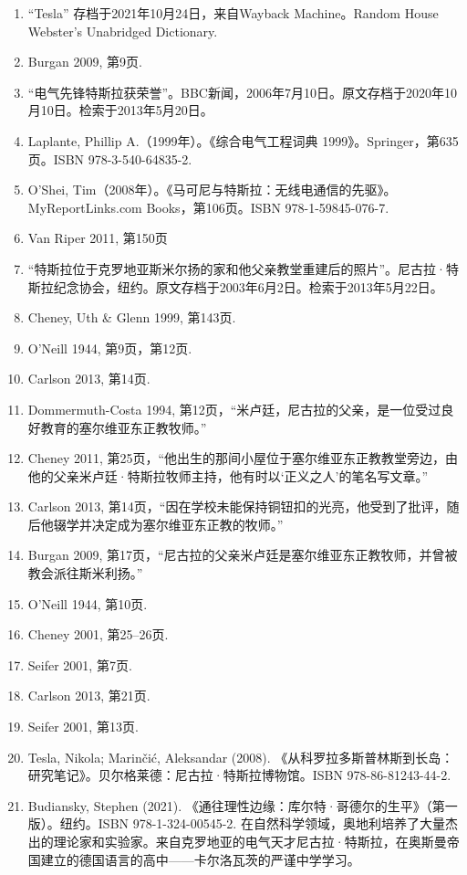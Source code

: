 \begin{enumerate}
\item “Tesla” 存档于2021年10月24日，来自Wayback Machine。Random House Webster's Unabridged Dictionary.  
\item Burgan 2009, 第9页.  
\item “电气先锋特斯拉获荣誉”。BBC新闻，2006年7月10日。原文存档于2020年10月10日。检索于2013年5月20日。  
\item Laplante, Phillip A.（1999年）。《综合电气工程词典 1999》。Springer，第635页。ISBN 978-3-540-64835-2.  
\item O'Shei, Tim（2008年）。《马可尼与特斯拉：无线电通信的先驱》。MyReportLinks.com Books，第106页。ISBN 978-1-59845-076-7.  
\item Van Riper 2011, 第150页  
\item “特斯拉位于克罗地亚斯米尔扬的家和他父亲教堂重建后的照片”。尼古拉·特斯拉纪念协会，纽约。原文存档于2003年6月2日。检索于2013年5月22日。  
\item Cheney, Uth & Glenn 1999, 第143页.  
\item O'Neill 1944, 第9页，第12页.  
\item Carlson 2013, 第14页.
\item Dommermuth-Costa 1994, 第12页，“米卢廷，尼古拉的父亲，是一位受过良好教育的塞尔维亚东正教牧师。”  
\item Cheney 2011, 第25页，“他出生的那间小屋位于塞尔维亚东正教教堂旁边，由他的父亲米卢廷·特斯拉牧师主持，他有时以‘正义之人’的笔名写文章。”  
\item Carlson 2013, 第14页，“因在学校未能保持铜钮扣的光亮，他受到了批评，随后他辍学并决定成为塞尔维亚东正教的牧师。”  
\item Burgan 2009, 第17页，“尼古拉的父亲米卢廷是塞尔维亚东正教牧师，并曾被教会派往斯米利扬。”  
\item O'Neill 1944, 第10页.  
\item Cheney 2001, 第25–26页.  
\item Seifer 2001, 第7页.  
\item Carlson 2013, 第21页.  
\item Seifer 2001, 第13页.  
\item Tesla, Nikola; Marinčić, Aleksandar (2008). 《从科罗拉多斯普林斯到长岛：研究笔记》。贝尔格莱德：尼古拉·特斯拉博物馆。ISBN 978-86-81243-44-2.  
\item Budiansky, Stephen (2021). 《通往理性边缘：库尔特·哥德尔的生平》（第一版）。纽约。ISBN 978-1-324-00545-2. 在自然科学领域，奥地利培养了大量杰出的理论家和实验家。来自克罗地亚的电气天才尼古拉·特斯拉，在奥斯曼帝国建立的德国语言的高中——卡尔洛瓦茨的严谨中学学习。

\end{enumerate}
